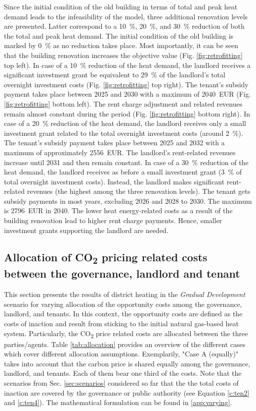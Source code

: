 Since the initial condition of the old building in terms of total and peak heat demand leads to the infeasibility of the model, three additional renovation levels are presented. Latter correspond to a \SI{10}{\%}, \SI{20}{\%}, and \SI{30}{\%} reduction of both the total and peak heat demand. The initial condition of the old building is marked by \SI{0}{\%} as no reduction takes place. Most importantly, it can be seen that the building renovation increases the objective value (Fig. \ref{fig:retrofitting} top left). In case of a \SI{10}{\%} reduction of the heat demand, the landlord receives a significant investment grant be equivalent to \SI{29}{\%} of the landlord's total overnight investment costs (Fig. \ref{fig:retrofitting} top right). The tenant's subsidy payment takes place between 2025 and 2030 with a maximum of \SI{2040}{EUR} (Fig. \ref{fig:retrofitting} bottom left). The rent charge adjustment and related revenues remain almost constant during the period (Fig. \ref{fig:retrofitting} bottom right). In case of a \SI{20}{\%} reduction of the heat demand, the landlord receives only a small investment grant related to the total overnight investment costs (around \SI{2}{\%}). The tenant's subsidy payment takes place between 2025 and 2032 with a maximum of approximately \SI{2556}{EUR}. The landlord's rent-related revenues increase until 2031 and then remain constant. In case of a \SI{30}{\%} reduction of the heat demand, the landlord receives as before a small investment grant (\SI{3}{\%} of total overnight investment costs). Instead, the landlord makes significant rent-related revenues (the highest among the three renovation levels). The tenant gets subsidy payments in most years, excluding 2026 and 2028 to 2030. The maximum is \SI{2796}{EUR} in 2040. The lower heat energy-related costs as a result of the building renovation lead to higher rent charge payments. Hence, smaller investment grants supporting the landlord are needed. 

\subsection{Allocation of CO\textsubscript{2} pricing related costs between the governance, landlord and tenant}\label{res:co2_shares}
This section presents the results of district heating in the \textit{Gradual Development} scenario for varying allocation of the opportunity costs among the governance, landlord, and tenants. In this context, the opportunity costs are defined as the costs of inaction and result from sticking to the initial natural gas-based heat system. Particularly, the CO\textsubscript{2} price related costs are allocated between the three parties/agents. Table \ref{tab:allocation} provides an overview of the different cases which cover different allocation assumptions. Exemplarily, "Case A (equally)" takes into account that the carbon price is shared equally among the governance, landlord, and tenants. Each of them bear one third of the costs. Note that the scenarios from Sec. \ref{sec:scenarios} considered so far that the the total costs of inaction are covered by the governance or public authority (see Equation \ref{c:ten2} and \ref{c:ten4}). The mathematical formulation can be found in \ref{app:varying}.

